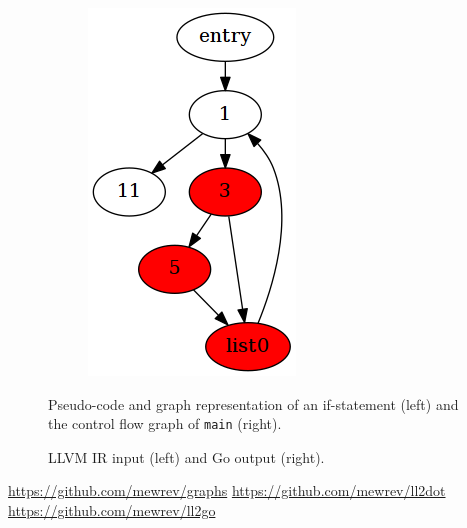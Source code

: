 \documentclass[a2paper,landscape,fontscale=0.35]{baposter}
\begin{document}
\begin{poster}
{\begin{figure}[H]
\begin{subfigure}[ht]{0.50\textwidth}
			\includegraphics[width=\textwidth]{inc/foo.png}
		\end{subfigure}
		\caption{Pseudo-code and graph representation of an if-statement (left) and the control flow graph of \texttt{main} (right).}
	\end{figure}
}

{
	\begin{figure}[H]
		\centering
		\begin{subfigure}[ht]{0.61\textwidth}
			
		\end{subfigure}
		\quad
		\begin{subfigure}[ht]{0.26\textwidth}
			
		\end{subfigure}
		\caption{LLVM IR input (left) and Go output (right).}
	\end{figure}
}

{
	\url{https://github.com/mewrev/graphs}
	\url{https://github.com/mewrev/ll2dot}
	\url{https://github.com/mewrev/ll2go}
}

\end{poster}
\end{document}
